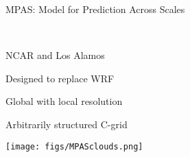 \begin{slide}{MPAS: Model for Prediction Across Scales}

\ \\
\begin{minipage}{0.4\linewidth}
\begin{list0}

\item NCAR and Los Alamos
\item Designed to replace WRF
\item Global with local resolution
\item Arbitrarily structured C-grid
\end{list0}
\end{minipage}
%
\begin{minipage}{0.58\linewidth}
\texttt{[image: figs/MPASclouds.png]}
\end{minipage}

\end{slide}

